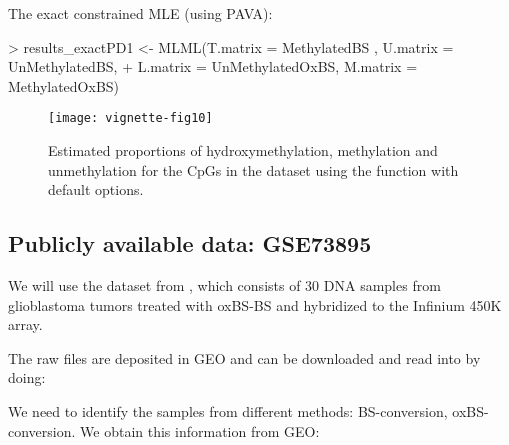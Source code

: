 \documentclass{article}
\begin{document}
The exact constrained MLE (using PAVA):

\begin{Schunk}
\begin{Sinput}
> results_exactPD1 <- MLML(T.matrix = MethylatedBS , U.matrix = UnMethylatedBS,
+                       L.matrix = UnMethylatedOxBS, M.matrix = MethylatedOxBS)
\end{Sinput}
\end{Schunk}





\begin{figure*}[h]
 \texttt{[image: vignette-fig10]}
 \caption{\label{fig:fig10} Estimated proportions of hydroxymethylation, methylation and unmethylation for the CpGs in the dataset using the  function with default options.}
\end{figure*}



\subsection{Publicly available data: GSE73895}

We will use the dataset from \cite{pmid27886174}, which consists of 30 DNA samples from glioblastoma tumors treated with oxBS-BS and hybridized to the Infinium 450K array.


The raw files are deposited in GEO and can be downloaded and read into \R{} by doing:
\begin{Schunk}
\end{Schunk}

We need to identify the samples from different methods: BS-conversion, oxBS-conversion. We obtain this information from GEO:
\end{document}
